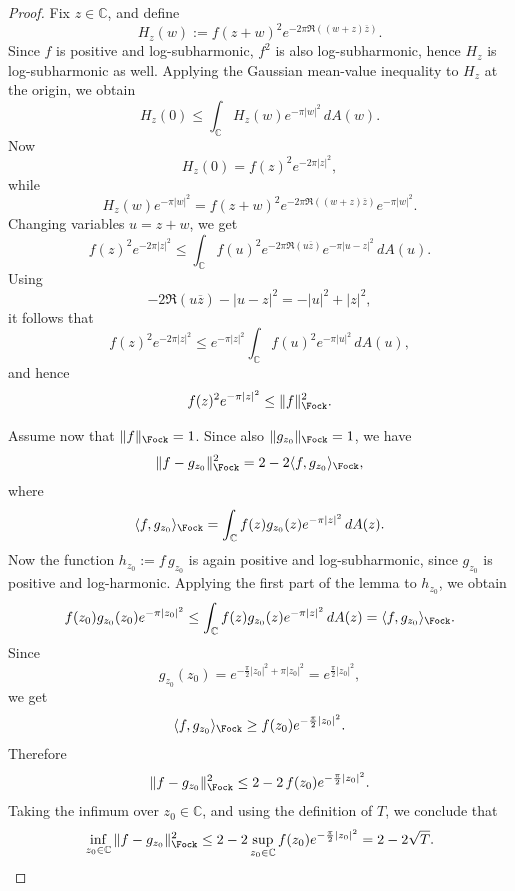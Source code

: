 \begin{proof}
Fix \(z\in\mathbb C\), and define
\[
H_z(w):=f(z+w)^2 e^{-2\pi\Re((w+z)\overline z)}.
\]
Since \(f\) is positive and log-subharmonic, \(f^2\) is also log-subharmonic, hence
\(H_z\) is log-subharmonic as well. Applying the Gaussian mean-value inequality to \(H_z\)
at the origin, we obtain
\[
H_z(0)\le \int_{\mathbb C} H_z(w)e^{-\pi|w|^2}\,dA(w).
\]
Now
\[
H_z(0)=f(z)^2e^{-2\pi|z|^2},
\]
while
\[
H_z(w)e^{-\pi|w|^2}
=
f(z+w)^2 e^{-2\pi\Re((w+z)\overline z)}e^{-\pi|w|^2}.
\]
Changing variables \(u=z+w\), we get
\[
f(z)^2e^{-2\pi|z|^2}
\le
\int_{\mathbb C}f(u)^2 e^{-2\pi\Re(u\overline z)}e^{-\pi|u-z|^2}\,dA(u).
\]
Using
\[
-2\Re(u\overline z)-|u-z|^2=-|u|^2+|z|^2,
\]
it follows that
\[
f(z)^2e^{-2\pi|z|^2}
\le
e^{-\pi|z|^2}\int_{\mathbb C}f(u)^2e^{-\pi|u|^2}\,dA(u),
\]
and hence
\[
f(z)^2e^{-\pi|z|^2}\le \|f\|_{\Fock}^2.
\]

Assume now that \(\|f\|_{\Fock}=1\). Since also \(\|g_{z_0}\|_{\Fock}=1\), we have
\[
\|f-g_{z_0}\|_{\Fock}^2
=
2-2\langle f,g_{z_0}\rangle_{\Fock},
\]
where
\[
\langle f,g_{z_0}\rangle_{\Fock}
=
\int_{\mathbb C} f(z)g_{z_0}(z)e^{-\pi|z|^2}\,dA(z).
\]
Now the function \(h_{z_0}:=f\,g_{z_0}\) is again positive and log-subharmonic, since
\(g_{z_0}\) is positive and log-harmonic. Applying the first part of the lemma to \(h_{z_0}\),
we obtain
\[
f(z_0)g_{z_0}(z_0)e^{-\pi|z_0|^2}
\le
\int_{\mathbb C} f(z)g_{z_0}(z)e^{-\pi|z|^2}\,dA(z)
=
\langle f,g_{z_0}\rangle_{\Fock}.
\]
Since
\[
g_{z_0}(z_0)=e^{-\frac{\pi}{2}|z_0|^2+\pi|z_0|^2}
=e^{\frac{\pi}{2}|z_0|^2},
\]
we get
\[
\langle f,g_{z_0}\rangle_{\Fock}\ge f(z_0)e^{-\frac{\pi}{2}|z_0|^2}.
\]
Therefore
\[
\|f-g_{z_0}\|_{\Fock}^2
\le
2-2\,f(z_0)e^{-\frac{\pi}{2}|z_0|^2}.
\]
Taking the infimum over \(z_0\in\mathbb C\), and using the definition of \(T\), we conclude that
\[
\inf_{z_0\in\mathbb C}\|f-g_{z_0}\|_{\Fock}^2
\le
2-2\sup_{z_0\in\mathbb C} f(z_0)e^{-\frac{\pi}{2}|z_0|^2}
=
2-2\sqrt{T}.
\]
\end{proof}
